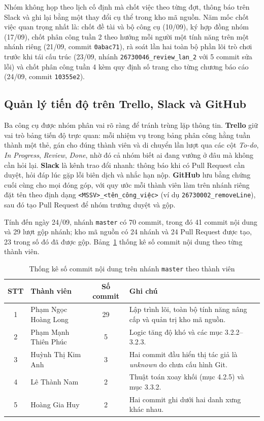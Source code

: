 Nhóm không họp theo lịch cố định mà chốt việc theo từng đợt, thông báo trên Slack và ghi lại bằng một thay đổi cụ thể trong kho mã nguồn. Năm mốc chốt việc quan trọng nhất là: chốt đề tài và bộ công cụ (10/09), ký hợp đồng nhóm (17/09), chốt phân công tuần 2 theo hướng mỗi người một tính năng trên một nhánh riêng (21/09, commit \texttt{0abac71}), rà soát lần hai toàn bộ phần lõi trò chơi trước khi tái cấu trúc (23/09, nhánh \texttt{26730046\_review\_lan\_2} với 5 commit sửa lỗi) và chốt phân công tuần 4 kèm quy định số trang cho từng chương báo cáo (24/09, commit \texttt{10355e2}).

\subsection{Quản lý tiến độ trên Trello, Slack và GitHub}

Ba công cụ được nhóm phân vai rõ ràng để tránh trùng lặp thông tin. \textbf{Trello} giữ vai trò bảng tiến độ trực quan: mỗi nhiệm vụ trong bảng phân công hằng tuần thành một thẻ, gán cho đúng thành viên và di chuyển lần lượt qua các cột \textit{To-do}, \textit{In Progress}, \textit{Review}, \textit{Done}, nhờ đó cả nhóm biết ai đang vướng ở đâu mà không cần hỏi lại. \textbf{Slack} là kênh trao đổi nhanh: thông báo khi có Pull Request cần duyệt, hỏi đáp lúc gặp lỗi biên dịch và nhắc hạn nộp. \textbf{GitHub} lưu bằng chứng cuối cùng cho mọi đóng góp, với quy ước mỗi thành viên làm trên nhánh riêng đặt tên theo định dạng \texttt{<MSSV>\_<tên\_công\_việc>} (ví dụ \texttt{26730002\_removeLine}), sau đó tạo Pull Request để nhóm trưởng duyệt và gộp.

Tính đến ngày 24/09, nhánh \texttt{master} có 70 commit, trong đó 41 commit nội dung và 29 lượt gộp nhánh; kho mã nguồn có 24 nhánh và 24 Pull Request được tạo, 23 trong số đó đã được gộp. Bảng~\ref{tab:thong_ke_git} thống kê số commit nội dung theo từng thành viên.

\begin{table}[H]
    \centering
    \caption{Thống kê số commit nội dung trên nhánh \texttt{master} theo thành viên}
    \label{tab:thong_ke_git}
    \renewcommand{\arraystretch}{1.3}
    \begin{tabularx}{\textwidth}{|c|p{4.2cm}|c|X|}
        \hline
        \textbf{STT} & \textbf{Thành viên} & \textbf{Số commit} & \textbf{Ghi chú} \\
        \hline
        1 & Phạm Ngọc Hoàng Long & 29 & Lập trình lõi, toàn bộ tính năng nâng cấp và quản trị kho mã nguồn. \\
        \hline
        2 & Phạm Mạnh Thiên Phúc & 5 & Logic tăng độ khó và các mục 3.2.2--3.2.3. \\
        \hline
        3 & Huỳnh Thị Kim Anh & 3 & Hai commit đầu hiển thị tác giả là \textit{unknown} do chưa cấu hình Git. \\
        \hline
        4 & Lê Thành Nam & 2 & Thuật toán xoay khối (mục 4.2.5) và mục 3.3.2. \\
        \hline
        5 & Hoàng Gia Huy & 2 & Hai commit ghi dưới hai danh xưng khác nhau. \\
        \hline
    \end{tabularx}
\end{table}

